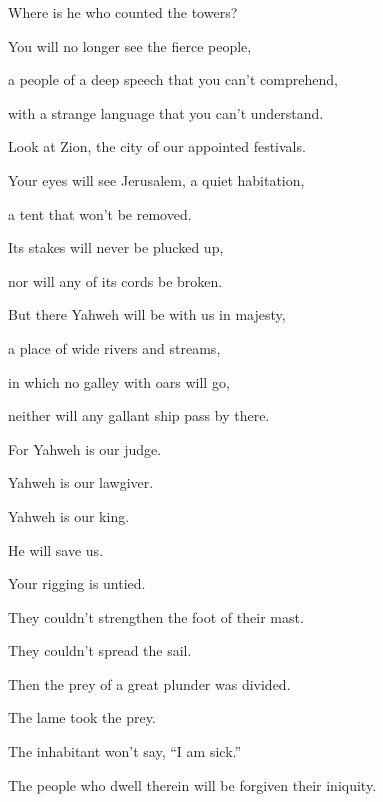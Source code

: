 {\par }{\QB Where is he who counted the towers?
\par }{\Q {}You will no longer see the fierce people,
\par }{\QB a people of a deep speech that you can’t comprehend,
\par }{\QB with a strange language that you can’t understand.
\par }{\Q {}Look at Zion, the city of our appointed festivals.
\par }{\QB Your eyes will see Jerusalem, a quiet habitation,
\par }{\QB a tent that won’t be removed.
\par }{\Q Its stakes will never be plucked up,
\par }{\QB nor will any of its cords be broken.
\par }{\Q {}But there Yahweh will be with us in majesty,
\par }{\QB a place of wide rivers and streams,
\par }{\QB in which no galley with oars will go,
\par }{\QB neither will any gallant ship pass by there.
\par }{\Q {}For Yahweh is our judge.
\par }{\QB Yahweh is our lawgiver.
\par }{\QB Yahweh is our king.
\par }{\QB He will save us.
\par }{\BB \par }{\Q {}Your rigging is untied.
\par }{\QB They couldn’t strengthen the foot of their mast.
\par }{\QB They couldn’t spread the sail.
\par }{\Q Then the prey of a great plunder was divided.
\par }{\QB The lame took the prey.
\par }{\BB \par }{\Q {}The inhabitant won’t say, “I am sick.”
\par }{\QB The people who dwell therein will be forgiven their iniquity.

}
